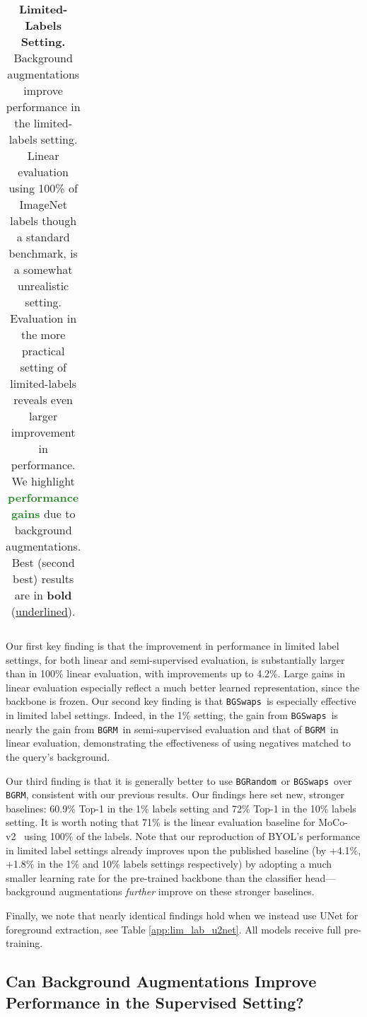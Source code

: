 \documentclass[twoside,11pt]{article}
\newcommand{\bgrm}{\texttt{BG\textunderscore RM}}
\newcommand{\bgswaps}{\texttt{BG\textunderscore Swaps}}
\newcommand{\bgrand}{\texttt{BG\textunderscore Random}}
\newcommand{\moco}{MoCo-v2}
\begin{document}
\begin{table}
\begin{tabular}{llcccc}
    \bottomrule
    \end{tabular}
    \caption{\textbf{Limited-Labels Setting.} Background augmentations improve performance in the limited-labels  setting. Linear evaluation using 100\% of ImageNet labels though a standard benchmark, is a somewhat unrealistic setting. Evaluation in the more practical setting of limited-labels reveals even larger improvement in performance. We highlight \textbf{\textcolor{ForestGreen}{performance gains}} due to background augmentations. Best (second best) results are in \textbf{bold} (\underline{underlined}).
    }
    \label{tab:lim_lab_deepusps}
\end{table}


Our first key finding is that the improvement in performance in limited label settings, for both linear and semi-supervised evaluation, is substantially larger than in 100\% linear evaluation, with improvements up to 4.2\%. Large gains in linear evaluation especially reflect a much better learned representation, since the backbone is frozen. Our second key finding is that \bgswaps~is especially effective in limited label settings. Indeed, in the 1\% setting, the gain from \bgswaps~is nearly  the gain from \bgrm~in semi-supervised evaluation and  that of \bgrm~in linear evaluation, demonstrating the effectiveness of using negatives matched to the query's background.

Our third finding is that it is generally better to use \bgrand~or \bgswaps~over \bgrm, consistent with our previous results. Our findings here set new, stronger baselines: 60.9\% Top-1 in the 1\% labels setting and 72\% Top-1 in the 10\% labels setting. It is worth noting that 71\% is the linear evaluation baseline for \moco~ using 100\% of the labels. Note that our reproduction of BYOL's performance in limited label settings already improves upon the published baseline (by +4.1\%, +1.8\% in the 1\% and 10\% labels settings respectively) by adopting a much smaller learning rate for the pre-trained backbone than the classifier head---background augmentations \textit{further} improve on these stronger baselines.

Finally, we note that nearly identical findings hold when we instead use UNet for foreground extraction, see Table \ref{app:lim_lab_u2net}. All models receive full pre-training.



\subsection{Can Background Augmentations Improve Performance in the Supervised Setting?}
\end{document}
